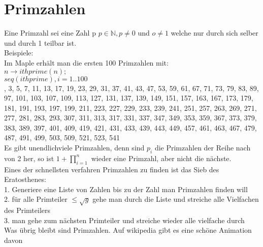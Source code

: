 \documentclass[a4paper]{scrartcl}
\begin{document}
\section{Primzahlen}
Eine Primzahl sei eine Zahl p $p \in \mathbb{N}, p \neq 0$ und $o \neq 1$ welche nur durch sich selber und durch 1 teilbar ist. \\
\newline
Beispiele: \\
Im Maple erhält man die ersten 100 Primzahlen mit: \\
$n \rightarrow ithprime(n);$ \\
$seq (ithprime), i=1..100$ \\
, 3, 5, 7, 11, 13, 17, 19, 23, 29, 31, 37, 41, 43, 47, 53, 59, 61, 67, 71, 73, 79, 83, 89, 97, 101, 103, 107, 109, 113, 127, 131, 137, 139, 149, 151, 157, 163, 167, 173, 179, 181, 191, 193, 197, 199, 211, 223, 227, 229, 233, 239, 241, 251, 257, 263, 269, 271, 277, 281, 283, 293, 307, 311, 313, 317, 331, 337, 347, 349, 353, 359, 367, 373, 379, 383, 389, 397, 401, 409, 419, 421, 431, 433, 439, 443, 449, 457, 461, 463, 467, 479, 487, 491, 499, 503, 509, 521, 523, 541 \\
\newline
Es gibt unendlichviele Primzahlen, denn sind $p_i$ die Primzahlen der Reihe nach  von 2 her, so ist $1 + \prod\limits_{i=1}^n$ wieder eine Primzahl, aber nicht die nächste. \\
\newline
Eines der schnellsten verfahren Primzahlen zu finden ist das Sieb des Eratosthenes: \\
1. Generiere eine Liste von Zahlen bis zu der Zahl man Primzahlen finden will \\
2. für alle Primteiler $\leq \sqrt{g}$ gehe man durch die Liste und streiche alle Vielfachen des Primteilers \\
3. man gehe zum nächsten Primteiler und streiche wieder alle vielfache durch \/
Was übrig bleibt sind Primzahlen. Auf wikipedia gibt es eine schöne Animation davon \\
\newline
\newpage
\end{document}

